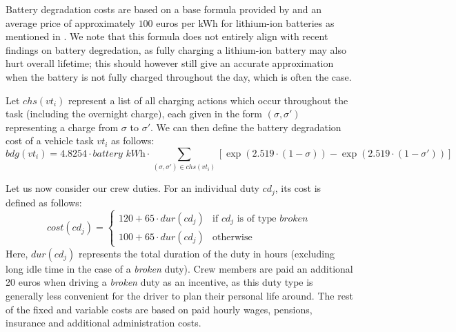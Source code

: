 \documentclass[]{article}
\begin{document}
Battery degradation costs are based on a base formula provided by \citet{vanKootenNiekerk2017} and an average price of approximately $100$ euros per kWh for lithium-ion batteries as mentioned in \citet{Ocatsaros2024}. We note that this formula does not entirely align with recent findings on battery degredation, as fully charging a lithium-ion battery may also hurt overall lifetime; this should however still give an accurate approximation when the battery is not fully charged throughout the day, which is often the case. 

Let $chs(vt_i)$ represent a list of all charging actions which occur throughout the task (including the overnight charge), each given in the form $(\sigma, \sigma')$ representing a charge from $\sigma$ to $\sigma'$. We can then define the battery degradation cost of a vehicle task $vt_i$ as follows:
\begin{equation}
  bdg(vt_i) = 4.8254 \cdot \textit{battery kWh} \cdot \sum_{(\sigma, \sigma') \in chs(vt_i)} [\exp(2.519 \cdot (1 - \sigma)) - \exp(2.519 \cdot (1 - \sigma'))] \nonumber
\end{equation}

\noindent Let us now consider our crew duties. For an individual duty $cd_j$, its cost is defined as follows:
\begin{equation}
  cost(cd_j) =
  \begin{cases}
    120 + 65 \cdot dur(cd_j) & \text{if } cd_j \text{ is of type }\textit{broken} \\ 
    100 + 65 \cdot dur(cd_j) & \text{otherwise}
  \end{cases} \nonumber
\end{equation}
Here, $dur(cd_j)$ represents the total duration of the duty in hours (excluding long idle time in the case of a \textit{broken} duty). Crew members are paid an additional 20 euros when driving a \textit{broken} duty as an incentive, as this duty type is generally less convenient for the driver to plan their personal life around. The rest of the fixed and variable costs are based on paid hourly wages, pensions, insurance and additional administration costs.
\end{document}
